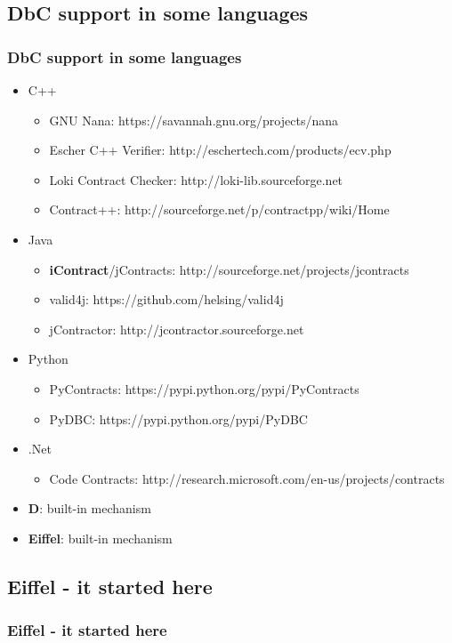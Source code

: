 \documentclass{beamer}
\begin{document}
\subsection{DbC support in some languages}
\begin{frame}
\frametitle{DbC support in some languages}
\begin{itemize}
  \item C++
  \begin{itemize}
    \item GNU Nana: https://savannah.gnu.org/projects/nana
    \item Escher C++ Verifier: http://eschertech.com/products/ecv.php
    \item Loki Contract Checker: http://loki-lib.sourceforge.net
    \item Contract++: http://sourceforge.net/p/contractpp/wiki/Home
  \end{itemize}
  \item Java
  \begin{itemize}
    \item \textbf{iContract}/jContracts: http://sourceforge.net/projects/jcontracts
    \item valid4j: https://github.com/helsing/valid4j
    \item jContractor: http://jcontractor.sourceforge.net
  \end{itemize}
  \item Python
  \begin{itemize}
    \item PyContracts: https://pypi.python.org/pypi/PyContracts
    \item PyDBC: https://pypi.python.org/pypi/PyDBC
  \end{itemize}
  \item .Net
  \begin{itemize}
    \item Code Contracts: http://research.microsoft.com/en-us/projects/contracts
  \end{itemize}
  \item \textbf{D}: built-in mechanism
  \item \textbf{Eiffel}: built-in mechanism
\end{itemize}
\end{frame}

\subsection{Eiffel - it started here}
\begin{frame}[fragile]
\frametitle{Eiffel - it started here}

\end{frame}
\end{document}
